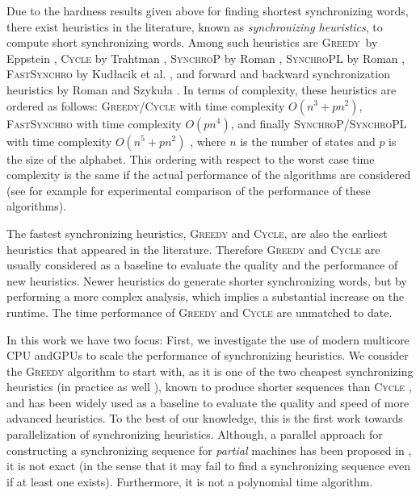 \documentclass[12pt]{article}
\newcommand{\kkcomm}[1]{{\color{red}{\bf kk: #1}}}
\newcommand{\greedyAlgo}{\textsc{Greedy}}
\begin{document}
Due to the hardness results given above for finding shortest synchronizing words, there exist heuristics in the literature, known as {\em synchronizing heuristics}, to compute short synchronizing words. Among such heuristics are 
\greedyAlgo\ by Eppstein \cite{Eppstein90}, \textsc{Cycle} by Trahtman \cite{Trahtman04}, 
\textsc{SynchroP} by Roman \cite{Roman09}, \textsc{SynchroPL} by Roman \cite{Roman09},  
\textsc{FastSynchro} by Kud{\l}acik et al. \cite{Roman12}, and forward and backward synchronization heuristics by Roman and Szyku{\l}a \cite{RS15}. In terms of complexity, these heuristics are ordered as follows: \textsc{Greedy}/\textsc{Cycle} with time complexity $O(n^3+pn^2)$, \textsc{FastSynchro} with time complexity $O(pn^4)$, and finally \textsc{SynchroP}/\textsc{SynchroPL} with time complexity $O(n^5+pn^2)$ \cite{Roman09,Roman12}, where $n$ is the number of states and $p$ is the size of the alphabet. This ordering with respect to the worst case time complexity is the same if the actual  performance of the algorithms are considered (see for example \cite{Roman12,RS15} for experimental comparison of the performance of these algorithms).

The fastest synchronizing heuristics, \textsc{Greedy} and \textsc{Cycle}, are also the earliest heuristics that appeared in the literature. Therefore \textsc{Greedy} and \textsc{Cycle} are usually considered as a baseline to evaluate the quality and the performance of new heuristics. Newer heuristics do generate shorter synchronizing words, but by performing a more complex analysis, which implies a substantial increase on the runtime. The time performance of \textsc{Greedy} and \textsc{Cycle} are unmatched to date. 


In this work we have two focus: First, we investigate the use of modern multicore CPU andGPUs to scale the performance of synchronizing heuristics. We consider the \textsc{Greedy} algorithm to start with, as it is one of the two cheapest synchronizing heuristics (in practice as well \cite{RS15}), known to produce shorter sequences than \textsc{Cycle} \cite{RS15}, and has been widely used as a baseline to evaluate the quality and speed of more advanced heuristics.  To the best of our knowledge, this is the first work towards parallelization of  synchronizing heuristics. Although, a parallel approach for constructing a synchronizing sequence for {\em partial}  machines \kkcomm{define partial} has been proposed in \cite{Uraz}, it is not exact (in the sense that it may fail to find a synchronizing sequence even if at least one exists). Furthermore, it is not a polynomial time algorithm.
\end{document}
